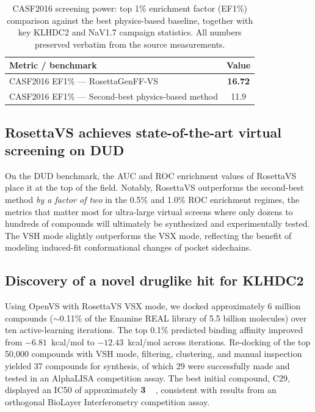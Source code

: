 \documentclass[11pt]{article}
\begin{document}
\begin{table}[h]
\centering
\small
\caption{CASF2016 screening power: top 1\% enrichment factor (EF1\%) comparison against the best physics-based baseline, together with key KLHDC2 and NaV1.7 campaign statistics. All numbers preserved verbatim from the source measurements.}
\label{tab:casf}
\begin{tabular}{lc}
\toprule
Metric / benchmark & Value \\
\midrule
CASF2016 EF1\% --- RosettaGenFF-VS & \textbf{16.72} \\
CASF2016 EF1\% --- Second-best physics-based method & 11.9 \\
\bottomrule
\end{tabular}
\end{table}

\subsection{RosettaVS achieves state-of-the-art virtual screening on DUD}
On the DUD benchmark, the AUC and ROC enrichment values of RosettaVS place it at the top of the field. Notably, RosettaVS outperforms the second-best method \emph{by a factor of two} in the 0.5\% and 1.0\% ROC enrichment regimes, the metrics that matter most for ultra-large virtual screens where only dozens to hundreds of compounds will ultimately be synthesized and experimentally tested. The VSH mode slightly outperforms the VSX mode, reflecting the benefit of modeling induced-fit conformational changes of pocket sidechains.

\subsection{Discovery of a novel druglike hit for KLHDC2}
Using OpenVS with RosettaVS VSX mode, we docked approximately 6 million compounds ($\sim$0.11\% of the Enamine REAL library of 5.5 billion molecules) over ten active-learning iterations. The top 0.1\% predicted binding affinity improved from $-6.81$~kcal/mol to $-12.43$~kcal/mol across iterations. Re-docking of the top 50{,}000 compounds with VSH mode, filtering, clustering, and manual inspection yielded 37 compounds for synthesis, of which 29 were successfully made and tested in an AlphaLISA competition assay. The best initial compound, C29, displayed an IC50 of approximately \textbf{3~\si{\micro\molar}}, consistent with results from an orthogonal BioLayer Interferometry competition assay.
\end{document}
